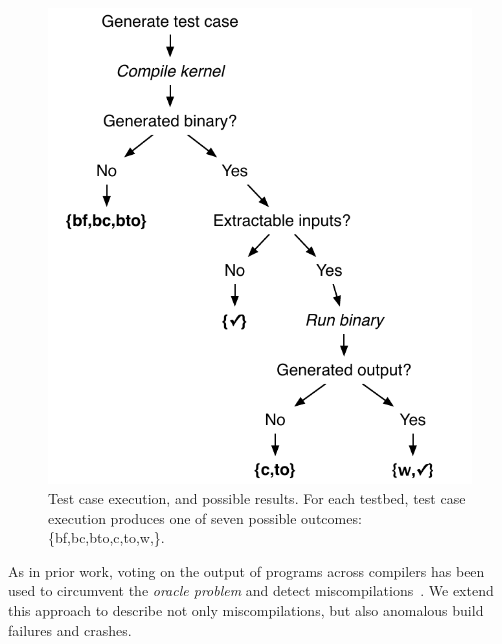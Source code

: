 \begin{figure}
  \centering %
  \includegraphics[width=.8\columnwidth]{img/test_process}%
  \caption{%
 	  Test case execution, and possible results. For each testbed, test case execution produces one of seven possible outcomes: \{bf,bc,bto,c,to,w,\cmark\}.%
  }%
  \label{fig:test-process} %
\end{figure}

As in prior work, voting on the output of programs across compilers has been used to circumvent the \emph{oracle problem} and detect miscompilations~\cite{McKeeman1998}. We extend this approach to describe not only miscompilations, but also anomalous build failures and crashes.

